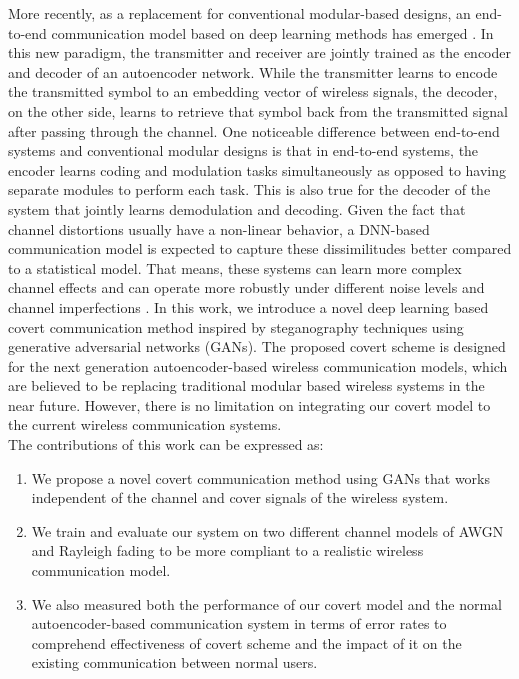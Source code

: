 More recently, as a replacement for conventional modular-based designs, an end-to-end communication model based on deep learning methods has emerged \cite{o2017introduction}. In this new paradigm, the transmitter and receiver are jointly trained as the encoder and decoder of an autoencoder network. While the transmitter learns to encode the transmitted symbol to an embedding vector of wireless signals, the decoder, on the other side, learns to retrieve that symbol back from the transmitted signal after passing through the channel. One noticeable difference between end-to-end systems and conventional modular designs is that in end-to-end systems, the encoder learns coding and modulation tasks simultaneously as opposed to having separate modules to perform each task. This is also true for the decoder of the system that jointly learns demodulation and decoding. Given the fact that channel distortions usually have a non-linear behavior, a DNN-based communication model is expected to capture these dissimilitudes better compared to a statistical model. That means, these systems can learn more complex channel effects and can operate more robustly under different noise levels and channel imperfections \cite{wang2017deep}.
In this work, we introduce a novel deep learning based covert communication method inspired by steganography techniques using generative adversarial networks (GANs). The proposed covert scheme is designed for the next generation autoencoder-based wireless communication models, which are believed to be replacing traditional modular based wireless systems in the near future. However, there is no limitation on integrating our covert model to the current wireless communication systems.\\
The contributions of this work can be expressed as:
\begin{enumerate}
	\item We propose a novel covert communication method using GANs that works independent of the channel and cover signals of the wireless system.
	\item We train and evaluate our system on two different channel models of AWGN and Rayleigh fading to be more compliant to a realistic wireless communication model.
	\item We also measured both the performance of our covert model and the normal autoencoder-based communication system in terms of error rates to comprehend effectiveness of covert scheme and the impact of it on the existing communication between normal users.
\end{enumerate}
